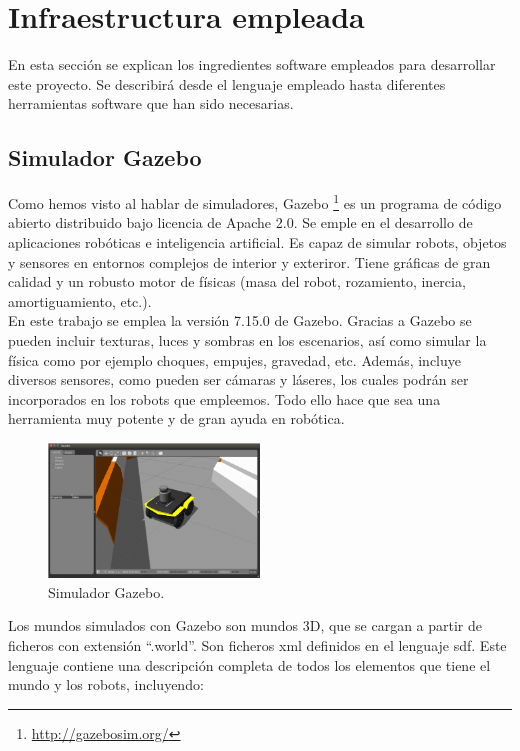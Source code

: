\section{Infraestructura empleada}

En esta sección se explican los ingredientes software empleados para desarrollar este proyecto. Se describirá desde el lenguaje empleado hasta diferentes herramientas software que han sido necesarias.

\subsection{Simulador Gazebo}

Como hemos visto al hablar de simuladores, Gazebo \footnote{\url{http://gazebosim.org/}} es un programa de código abierto distribuido bajo licencia de Apache 2.0. Se emple en el desarrollo de aplicaciones robóticas e inteligencia artificial. Es capaz de simular robots, objetos y sensores en entornos complejos de interior y exteriror. Tiene gráficas de gran calidad y un robusto motor de físicas (masa del robot, rozamiento, inercia, amortiguamiento, etc.).\\

En este trabajo se emplea la versión 7.15.0 de Gazebo. Gracias a Gazebo se pueden incluir texturas, luces y sombras en los escenarios, así como simular la física como por ejemplo choques, empujes, gravedad, etc. Además, incluye diversos sensores, como pueden ser cámaras y láseres, los cuales podrán ser incorporados en los robots que empleemos. Todo ello hace que sea una herramienta muy potente y de gran ayuda en robótica.\\

\begin{figure}
\begin{center}
	\includegraphics[width=0.5\textwidth]{figures/Estado_arte/gazebo2.png}
   \caption{Simulador Gazebo.}
	\label{fig.gazebo1  }
\end{center}
\end{figure}

Los mundos simulados con Gazebo son mundos 3D, que se cargan a partir de ficheros con extensión ``.world''. Son ficheros \acrfull{xml} definidos en el lenguaje \acrfull{sdf}. Este lenguaje contiene una descripción completa de todos los elementos que tiene el mundo y los robots, incluyendo:


